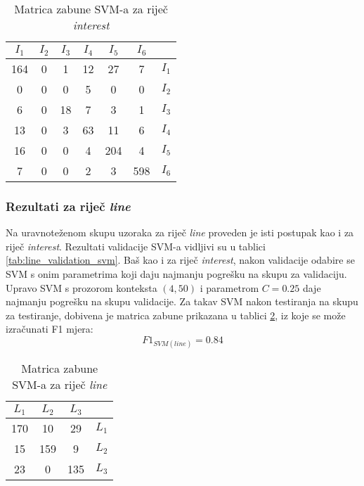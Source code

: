 \documentclass[10pt, a4paper]{article}
\begin{document}
\begin{table}[!hbtp]
\caption{Matrica zabune SVM-a za riječ \emph{interest}}
\label{tab:interest_confusion_svm}
\begin{center}
\begin{tabular}{|cccccc|c|}
\hline
$I_1$ & $I_2$ & $I_3$ & $I_4$ & $I_5$ & $I_6$ &  \\
\hline
 164 & 0 &  1 & 12 & 27 &  7 & $I_1$  \\
   0 & 0 &  0 &  5 &  0 &  0 & $I_2$  \\
   6 & 0 & 18 &  7 &  3 &  1 & $I_3$  \\
  13 & 0 & 3  & 63 & 11 &  6 & $I_4$  \\
  16 & 0 & 0  & 4  &204 &  4 & $I_5$  \\
   7 & 0 & 0  & 2  &  3 & 598  &$I_6$  \\
\hline
\end{tabular}
\end{center}
\end{table}
\subsubsection{Rezultati za riječ \emph{line}} 
Na uravnoteženom skupu uzoraka za riječ \emph{line} proveden
je isti postupak kao i za riječ \emph{interest}. 
Rezultati validacije SVM-a vidljivi su u tablici \ref{tab:line_validation_svm}.
Baš kao i za riječ \emph{interest}, nakon validacije odabire se
SVM s onim parametrima koji daju najmanju pogrešku na skupu za validaciju.
Upravo SVM s prozorom konteksta $(4,50)$ i parametrom $C = 0.25$ daje 
najmanju pogrešku na skupu validacije.
Za takav SVM nakon testiranja na skupu za testiranje, dobivena
je matrica zabune prikazana u tablici \ref{tab:line_confusion_svm},
iz koje se može izračunati F1 mjera:
\begin{equation}
\label{eq:f1_svm_line}
F1_{SVM(line)} = 0.84
\end{equation}

\begin{table}[!hbtp]
\caption{Matrica zabune SVM-a za riječ \emph{line}}
\label{tab:line_confusion_svm}
\begin{center}
\begin{tabular}{|ccc|c|}
\hline
$L_1$ & $L_2$ & $L_3$ &  \\
\hline
 170  & 10  & 29 & $L_1$ \\
  15  & 159  & 9 & $L_2$ \\
  23  & 0  & 135 & $L_3$ \\
\hline
\end{tabular}
\end{center}
\end{table}
\end{document}
